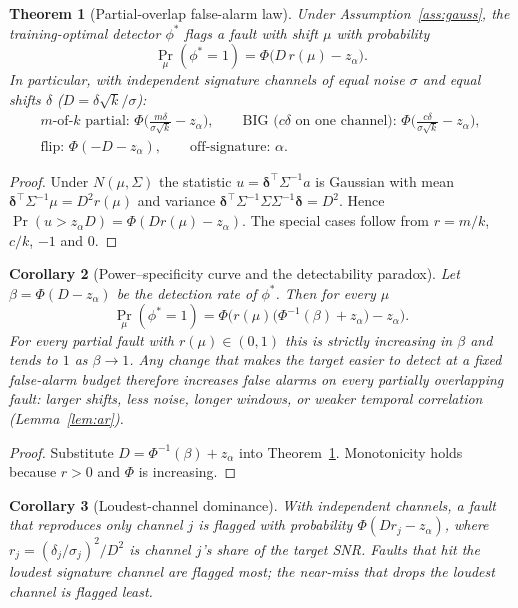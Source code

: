 \documentclass[11pt]{article}
\newtheorem{theorem}{Theorem}[section]
\newtheorem{corollary}[theorem]{Corollary}
\theoremstyle{definition}
\theoremstyle{remark}
\newcommand{\1}{\mathbf{1}}
\begin{document}
\begin{theorem}[Partial-overlap false-alarm law]\label{thm:law}
Under Assumption~\ref{ass:gauss}, the training-optimal detector $\phi^*$ flags a fault with shift $\mu$ with probability
\[
\Pr_\mu(\phi^*=1)=\Phi\big(D\,r(\mu)-z_\alpha\big).
\]
In particular, with independent signature channels of equal noise $\sigma$ and equal shifts $\delta$ ($D=\delta\sqrt{k}/\sigma$):
\begin{gather*}
\text{$m$-of-$k$ partial: }\Phi\Big(\tfrac{m\delta}{\sigma\sqrt k}-z_\alpha\Big),\qquad
\text{BIG ($c\delta$ on one channel): }\Phi\Big(\tfrac{c\delta}{\sigma\sqrt k}-z_\alpha\Big),\\
\text{flip: }\Phi(-D-z_\alpha),\qquad
\text{off-signature: }\alpha .
\end{gather*}
\end{theorem}
\begin{proof}
Under $N(\mu,\Sigma)$ the statistic $u=\bm\delta^\top\Sigma^{-1}a$ is Gaussian with mean $\bm\delta^\top\Sigma^{-1}\mu=D^2r(\mu)$ and variance $\bm\delta^\top\Sigma^{-1}\Sigma\Sigma^{-1}\bm\delta=D^2$. Hence $\Pr(u>z_\alpha D)=\Phi(Dr(\mu)-z_\alpha)$. The special cases follow from $r=m/k$, $c/k$, $-1$ and $0$.
\end{proof}

\begin{corollary}[Power--specificity curve and the detectability paradox]\label{cor:paradox}
Let $\beta=\Phi(D-z_\alpha)$ be the detection rate of $\phi^*$. Then for every $\mu$
\[
\Pr_\mu(\phi^*=1)=\Phi\Big(r(\mu)\big(\Phi^{-1}(\beta)+z_\alpha\big)-z_\alpha\Big).
\]
For every partial fault with $r(\mu)\in(0,1)$ this is strictly increasing in $\beta$ and tends to $1$ as $\beta\to1$. Any change that makes the target easier to detect at a fixed false-alarm budget therefore increases false alarms on \emph{every} partially overlapping fault: larger shifts, less noise, longer windows, or weaker temporal correlation (Lemma~\ref{lem:ar}).
\end{corollary}
\begin{proof}
Substitute $D=\Phi^{-1}(\beta)+z_\alpha$ into Theorem~\ref{thm:law}. Monotonicity holds because $r>0$ and $\Phi$ is increasing.
\end{proof}

\begin{corollary}[Loudest-channel dominance]\label{cor:loud}
With independent channels, a fault that reproduces only channel $j$ is flagged with probability $\Phi(D r_j-z_\alpha)$, where $r_j=(\delta_j/\sigma_j)^2/D^2$ is channel $j$'s share of the target SNR. Faults that hit the loudest signature channel are flagged most; the near-miss that drops the loudest channel is flagged least.
\end{corollary}
\end{document}
